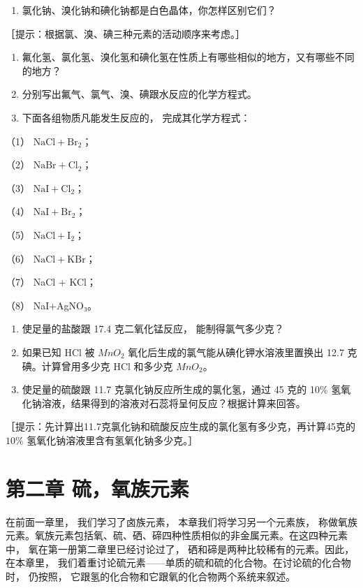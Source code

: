 \begin{enumerate}[start=4]
\item
  氯化钠、溴化钠和碘化钠都是白色晶体，你怎样区别它们？
\end{enumerate}

［提示：根据氯、溴、碘三种元素的活动顺序来考虑。］

\begin{enumerate}[start=5]
\item
  氟化氢、氯化氢、溴化氢和碘化氢在性质上有哪些相似的地方，又有哪些不同的地方？
\item
  分别写出氟气、氯气、溴、碘跟水反应的化学方程式。
\item
  下面各组物质凡能发生反应的， 完成其化学方程式：
\end{enumerate}

（1） \(\mathrm{NaCl} + \mathrm{Br}_2\)；

（2） \(\mathrm{NaBr} + \mathrm{Cl}_2\)；

（3） \(\mathrm{NaI} + \mathrm{Cl}_2\)；

（4） \(\mathrm{NaI} + \mathrm{Br}_2\)；

（5） \(\mathrm{NaCl} + \mathrm{I}_2\)；

（6） \(\mathrm{NaCl} + \mathrm{KBr}\)；

（7） NaCl + KCl；

（8） NaI+AgNO₃。

\begin{enumerate}[start=8]
\item
  使足量的盐酸跟 17.4 克二氧化锰反应， 能制得氯气多少克？
\item
  如果已知 HCl 被 \(MnO_{2}\) 氧化后生成的氯气能从碘化钾水溶液里置换出
  12.7 克碘。计算曾用多少克 HCl 和多少克 \(MnO_{2}\)。
\item
  使足量的硫酸跟 11.7 克氯化钠反应所生成的氯化氢，通过 45 克的 10\%
  氢氧化钠溶液，结果得到的溶液对石蕊将呈何反应？根据计算来回答。
\end{enumerate}

［提示：先计算出11.7克氯化钠和硫酸反应生成的氯化氢有多少克，再计算45克的
\(10\%\) 氢氧化钠溶液里含有氢氧化钠多少克。］

\chapter{第二章 硫，氧族元素}

在前面一章里， 我们学习了卤族元素， 本章我们将学习另一个元素族，
称做氧族元素。氧族元素包括氧、硫、硒、碲四种性质相似的非金属元素。在这四种元素中，
氧在第一册第二章里已经讨论过了， 硒和碲是两种比较稀有的元素。因此，
在本章里，
我们着重讨论硫元素------单质的硫和硫的化合物。在讨论硫的化合物时，
仍按照， 它跟氢的化合物和它跟氧的化合物两个系统来叙述。

